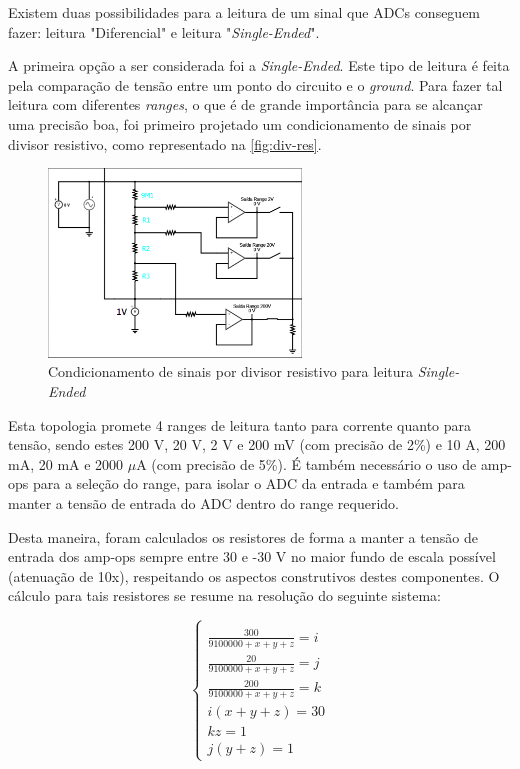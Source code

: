 Existem duas possibilidades para a leitura de um sinal que \gls{ADC}s conseguem fazer: leitura "Diferencial" e leitura "\textit{Single-Ended}".

A primeira opção a ser considerada foi a \textit{Single-Ended}. Este tipo de leitura é feita pela comparação de tensão entre um ponto do circuito e o \textit{ground}. Para fazer tal leitura com diferentes \textit{ranges}, o que é de grande importância para se alcançar uma precisão boa, foi primeiro projetado um condicionamento de sinais por divisor resistivo, como representado na \autoref{fig:div-res}.

\begin{figure}[htb!]
    \caption{Condicionamento de sinais por divisor resistivo para leitura \textit{Single-Ended}}
    \label{fig:div-res}
    \includegraphics[width=0.6\textwidth]{figuras/div-res.png}
    \fonte{}
\end{figure}

Esta topologia promete 4 ranges de leitura tanto para corrente quanto para tensão, sendo estes 200 V, 20 V, 2 V e 200 mV (com precisão de 2\%) e 10 A, 200 mA, 20 mA e 2000 $\mu$A (com precisão de 5\%). É também necessário o uso de \gls{amp-op}s para a seleção do range, para isolar o \gls{ADC} da entrada e também para manter a tensão de entrada do \gls{ADC} dentro do range requerido.

Desta maneira, foram calculados os resistores de forma a manter a tensão de entrada dos \gls{amp-op}s sempre entre 30 e -30 V no maior fundo de escala possível (atenuação de 10x), respeitando os aspectos construtivos destes componentes. O cálculo para tais resistores se resume na resolução do seguinte sistema:

\begin{equation}
    \label{eq01}
    \left\{\begin{matrix}
        \\ \frac{300}{9100000+x+y+z} = i
        \\ \frac{20}{9100000+x+y+z} = j
        \\ \frac{200}{9100000+x+y+z} = k
        \\ i (x+y+z) = 30
        \\ kz = 1
        \\ j(y+z) = 1
    \end{matrix}\right.
\end{equation}

